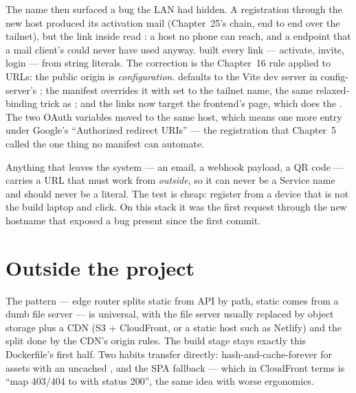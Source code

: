 The name then surfaced a bug the LAN had hidden. A registration
through the new host produced its activation mail (Chapter~25's
chain, end to end over the tailnet), but the link inside read
: a host no
phone can reach, and a  endpoint that a mail client's
 could never have used anyway.  built
every link --- activate, invite, login --- from string literals. The
correction is the Chapter~16 rule applied to URLs: the public origin
is \emph{configuration}.  defaults to the
Vite dev server in config-server's ;
the manifest overrides it with  set to
the tailnet name, the same relaxed-binding trick as
; and the links now target the frontend's
 page, which does the . The two OAuth
variables moved to the same host, which means one more entry under
Google's ``Authorized redirect URIs'' --- the registration that
Chapter~5 called the one thing no manifest can automate.

\begin{pitfall}
Anything that leaves the system --- an email, a webhook payload, a
QR code --- carries a URL that must work from \emph{outside}, so it
can never be a Service name and should never be a literal. The test
is cheap: register from a device that is not the build laptop and
click. On this stack it was the first request through the new
hostname that exposed a bug present since the first commit.
\end{pitfall}

\section{Outside the project}

The pattern --- edge router splits static from API by path, static
comes from a dumb file server --- is universal, with the file server
usually replaced by object storage plus a CDN (S3 + CloudFront, or a
static host such as Netlify) and the split done by the CDN's origin
rules. The build stage stays exactly this Dockerfile's first half.
Two habits transfer directly: hash-and-cache-forever for assets with
an uncached , and the SPA fallback --- which in
CloudFront terms is ``map 403/404 to  with status
200'', the same idea with worse ergonomics.

